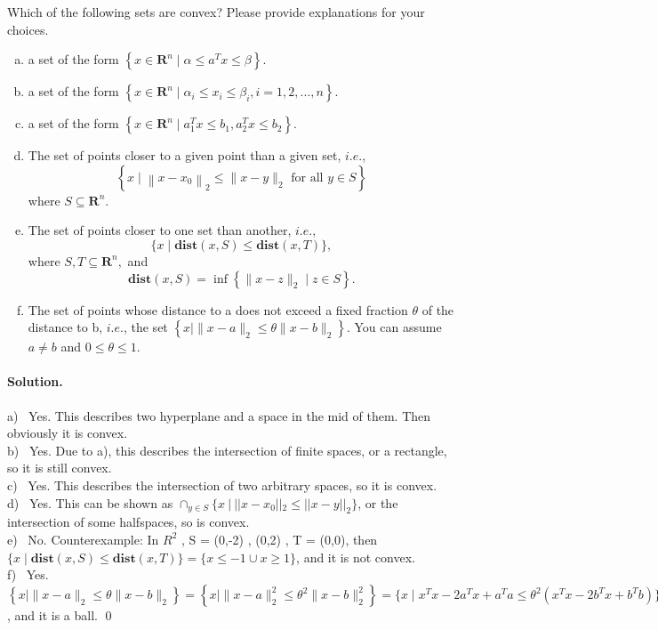 \documentclass[a4paper]{article}
\newenvironment{solution}
{\color{blue} \paragraph{Solution.}}
{\newline \qed}
\begin{document}
\noindent
Which of the following sets are convex?
Please provide explanations for your choices.
\begin{enumerate}[a)]
    \item a set of the form $\left\{x \in \mathbf{R}^{n} \mid \alpha \leq a^{T} x \leq \beta\right\}$.
    \item a set of the form $\left\{x \in \mathbf{R}^{n} \mid \alpha_i \leq  x_i \leq \beta_i,i=1,2,...,n\right\}$.
    \item a set of the form $\left\{x \in \mathbf{R}^{n} \mid a_1^{T} x \leq b_1, a_2^{T} x \leq b_2\right\}$.
    \item  The set of points closer to a given point than a given set, $i.e.$,
          $$\left\{x \mid\left\|x-x_{0}\right\|_{2} \leq\|x-y\|_{2} \text { for all } y \in S\right\}$$
          where $S \subseteq \mathbf{R}^{n}$.
    \item The set of points closer to one set than another, $i.e.$,
          $$\{x \mid \textbf{dist}(x, S) \leq \textbf{dist}(x, T)\},$$
          where $S,T\subseteq \mathbf{R}^{n},$ and
          $$\textbf{dist}(x, S)=\inf \left\{\|x-z\|_{2} \mid z \in S\right\}.$$
    \item The set of points whose distance to a does not exceed a fixed fraction $\theta$ of the
          distance to b, $i.e.$, the set $\left\{x \mid\|x-a\|_{2} \leq \theta\|x-b\|_{2}\right\}.$ You can assume $a \neq b $ and
          $0 \leq \theta \leq 1$.

\end{enumerate}
\begin{solution}
    a) \ Yes. This describes two hyperplane and a space in the mid of them. Then obviously it is convex.\\
    b) \ Yes. Due to a), this describes the intersection of finite spaces, or a rectangle, so it is still convex.\\
    c) \ Yes. This describes the intersection of two arbitrary spaces, so it is convex.\\
    d) \ Yes. This can be shown as $\cap _{y \in S} \{x \ | \ ||x-x_0||_2 \leq ||x-y||_2\}$, or the intersection of some halfspaces, so is convex.\\
    e) \ No. Counterexample: In $R^2$ , S = {(0,-2) , (0,2)} , T = {(0,0)}, then $\{x \mid \textbf{dist}(x, S) \leq \textbf{dist}(x, T)\} = \{x \leq -1 \cup x \geq 1\}$, and it is not convex.\\
    f) \ Yes. $\left\{x \mid\|x-a\|_{2} \leq \theta\|x-b\|_{2}\right\} = \left\{x \mid\|x-a\|_{2}^2 \leq \theta^2\|x-b\|_{2}^2\right\} = \{x \mid x^Tx - 2a^Tx + a^Ta \leq \theta^2(x^Tx - 2b^Tx + b^Tb)\} = \{x \mid (1 - \theta^2)x^Tx - 2(a - \theta^2 b)^T x + (a^Ta - \theta^2 b^Tb) \leq 0\}$, and it is a ball.
\end{solution}
\end{document}

